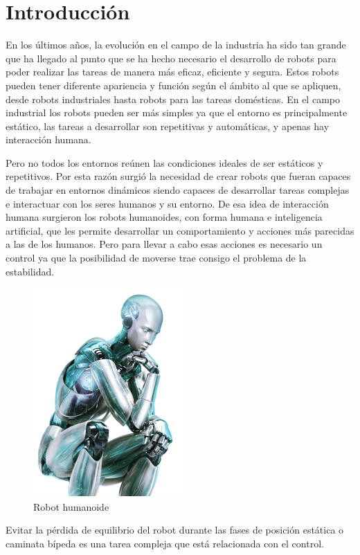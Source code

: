 \section{Introducción}

En los últimos años, la evolución en el campo de la industria ha sido tan grande que ha llegado al punto que se ha hecho necesario el desarrollo de robots para poder realizar las tareas de manera más eficaz, eficiente y segura. Estos robots pueden tener diferente apariencia y función según el ámbito al que se apliquen, desde robots industriales hasta robots para las tareas domésticas. En el campo industrial los robots pueden ser más simples ya que el entorno es principalmente estático, las tareas a desarrollar son repetitivas y automáticas, y apenas hay interacción humana. 

Pero no todos los entornos reúnen las condiciones ideales de ser estáticos y repetitivos. Por esta razón surgió la necesidad de crear robots que fueran capaces de trabajar en entornos dinámicos siendo capaces de desarrollar tareas complejas e interactuar con los seres humanos y su entorno. De esa idea de interacción humana surgieron los robots humanoides, con forma humana e inteligencia artificial, que les permite desarrollar un comportamiento y acciones más parecidas a las de los humanos. Pero para llevar a cabo esas acciones es necesario un control ya que la posibilidad de moverse trae consigo el problema de la estabilidad.

\begin{figure}[H]
\centering
\includegraphics[scale=0.7]{imagenes/apartado_1/11_robot_humanoide}
\caption{Robot humanoide \cite{ref39}}
\label{figura1}
\end{figure}

Evitar la pérdida de equilibrio del robot durante las fases de posición estática o caminata bípeda es una tarea compleja que está relacionada con el control.

